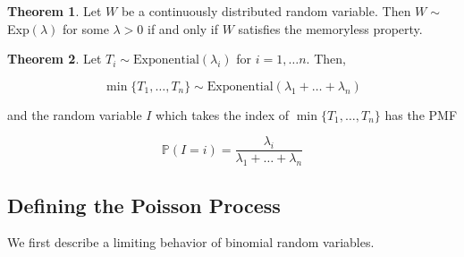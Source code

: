 \documentclass{article}
\theoremstyle{definition}
\newtheorem{theorem}{Theorem}[section]
\theoremstyle{remark}
\theoremstyle{definition}
\begin{document}
    \begin{theorem}
      Let $W$ be a continuously distributed random variable. Then $W \sim$ Exp$(\lambda)$ for some $\lambda > 0$ if and only if $W$ satisfies the memoryless property. 
    \end{theorem}

    \begin{theorem}
      Let $T_i \sim \mathrm{Exponential}(\lambda_i)$ for $i = 1, \ldots n$. Then, 

        \[\min\{T_1, \ldots, T_n\} \sim \mathrm{Exponential}(\lambda_1 + \ldots + \lambda_n)\]

      and the random variable $I$ which takes the index of $\min\{T_1, \ldots, T_n\}$ has the PMF 

        \[\mathbb{P}(I = i) = \frac{\lambda_i}{\lambda_1 + \ldots + \lambda_n}\]
    \end{theorem}

  \subsection{Defining the Poisson Process}

    We first describe a limiting behavior of binomial random variables. 
\end{document}
